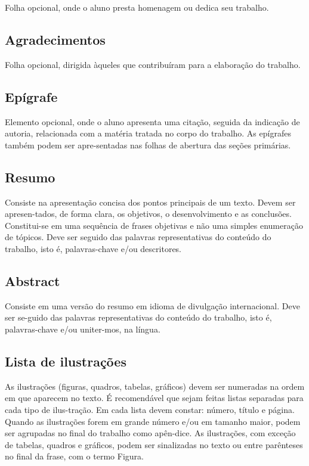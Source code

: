 Folha opcional, onde o aluno presta homenagem ou dedica seu trabalho.

\subsection{Agradecimentos}

Folha opcional, dirigida àqueles que contribuíram para a
elaboração do trabalho.

\subsection{Epígrafe}

Elemento opcional, onde o aluno apresenta uma citação, seguida da
indicação de autoria, relacionada com a matéria tratada no corpo do trabalho. As epígrafes também podem ser apre-sentadas nas folhas de abertura das seções primárias.

\subsection{Resumo}

Consiste na apresentação concisa dos pontos principais de um
texto. Devem ser apresen-tados, de forma clara, os objetivos, o desenvolvimento e as conclusões. Constitui-se em uma sequência de frases objetivas e não uma simples enumeração de tópicos. Deve ser seguido das palavras representativas do conteúdo do trabalho, isto é, palavras-chave e/ou descritores.

\subsection{Abstract}

Consiste em uma versão do resumo em idioma de divulgação
internacional. Deve ser se-guido das palavras representativas do conteúdo do trabalho, isto é, palavras-chave e/ou uniter-mos, na língua.

\subsection{Lista de ilustrações}

As ilustrações (figuras, quadros, tabelas, gráficos) devem ser
numeradas na ordem em que aparecem no texto. É recomendável que sejam feitas listas separadas para cada tipo de ilus-tração. Em cada lista devem constar: número, título e página. Quando as ilustrações forem em grande número e/ou em tamanho maior, podem ser agrupadas no final do trabalho como apên-dice. As ilustrações, com exceção de tabelas, quadros e gráficos, podem ser sinalizadas no texto ou entre parênteses no final da frase, com o termo Figura.

